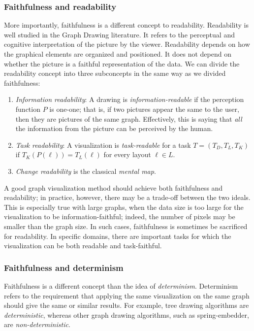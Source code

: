 \documentclass[10pt,journal,cspaper,compsoc]{IEEEtran}
\begin{document}
\subsubsection{Faithfulness and readability}
More importantly, faithfulness is a different concept to readability.
Readability is well studied in the Graph Drawing literature. It refers to the perceptual and cognitive interpretation of the picture by the viewer. Readability depends on how the graphical elements are organized and positioned. It does not depend on whether the picture is a faithful representation of the data. We can divide the readability concept into three subconcepts in the same way as we divided faithfulness:
\begin{enumerate}
  \item \emph{Information readability}: A drawing is \emph{information-readable} if the perception function $P$ is one-one; that is, if two pictures appear the same to the user, then they are pictures of the same graph. Effectively, this is saying that \emph{all} the information from the picture can be perceived by the human.
  \item \emph{Task readability}: A visualization is \emph{task-readable} for a task $T = (T_D, T_L, T_K)$ if $T_K( P (\ell) ) = T_L( \ell)$ for every layout $\ell \in L$.
  \item \emph{Change readability} is the classical \emph{mental map}.
\end{enumerate}
A good graph visualization method should achieve both faithfulness and readability; in practice, however, there may be a trade-off between the two ideals. This is especially true with large graphs, when the data size is too large for the visualization to be information-faithful; indeed, the number of pixels may be smaller than the graph size. In such cases, faithfulness is sometimes be sacrificed for readability. In specific domains, there are important tasks for which the visualization can be both readable and task-faithful.

\subsubsection{Faithfulness and determinism} 
Faithfulness is a different concept than the idea of \emph{determinism}. Determinism refers to the requirement that applying the same visualization on the same graph should give the same or similar results. For example, tree drawing algorithms are \emph{deterministic}, whereas other graph drawing algorithms, such as spring-embedder, are \emph{non-deterministic}. 
\end{document}
